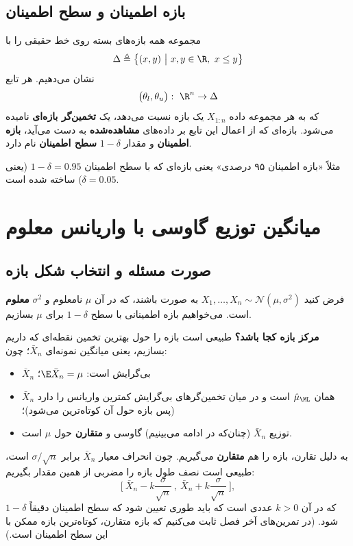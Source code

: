 \subsection{بازه اطمینان و سطح اطمینان}
\begin{definition}
مجموعه همه بازه‌های بسته روی خط حقیقی را با
\[
\Delta\triangleq\big\{(x,y)\ \big|\ x,y\in\R,\ x\le y\big\}
\]
نشان می‌دهیم. هر تابع
\[
\big(\theta_l,\theta_u\big):\ \R^n\to\Delta
\]
که به هر مجموعه داده $X_{1:n}$ یک بازه نسبت می‌دهد، یک \textbf{تخمین‌گر بازه‌ای} نامیده می‌شود. بازه‌ای که از اعمال این تابع بر داده‌های \textbf{مشاهده‌شده} به دست می‌آید، \textbf{بازه اطمینان} و مقدار $1-\delta$ \textbf{سطح اطمینان} نام دارد.
\end{definition}
مثلاً «بازه اطمینان ۹۵ درصدی» یعنی بازه‌ای که با سطح اطمینان $1-\delta=0.95$ (یعنی $\delta=0.05$) ساخته شده است.

\section{میانگین توزیع گاوسی با واریانس معلوم}

\subsection{صورت مسئله و انتخاب شکل بازه}
فرض کنید $X_1,\ldots,X_n\sim\mathcal N(\mu,\sigma^2)$ به صورت  باشند، که در آن $\mu$ نامعلوم و $\sigma^2$ \textbf{معلوم} است. می‌خواهیم بازه اطمینانی با سطح $1-\delta$ برای $\mu$ بسازیم.

\textbf{مرکز بازه کجا باشد؟} طبیعی است بازه را حول بهترین تخمین نقطه‌ای که داریم بسازیم، یعنی میانگین نمونه‌ای $\bar X_n$؛ چون:
\begin{itemize}
\item $\bar X_n$ بی‌گرایش است: $\E\bar X_n=\mu$؛
\item $\bar X_n$ همان $\hat\mu_\ML$ است و در میان تخمین‌گرهای بی‌گرایش کمترین واریانس را دارد (پس بازه حول آن کوتاه‌ترین می‌شود)؛
\item توزیع $\bar X_n$ (چنان‌که در ادامه می‌بینیم) گاوسی و \textbf{متقارن} حول $\mu$ است.
\end{itemize}
به دلیل تقارن، بازه را هم \textbf{متقارن} می‌گیریم. چون انحراف معیار $\bar X_n$ برابر $\sigma/\sqrt n$ است، طبیعی است نصف طول بازه را مضربی از همین مقدار بگیریم:
\[
\Big[\ \bar X_n-k\frac{\sigma}{\sqrt n}\ ,\ \bar X_n+k\frac{\sigma}{\sqrt n}\ \Big],
\]
که در آن $k>0$ عددی است که باید طوری تعیین شود که سطح اطمینان دقیقاً $1-\delta$ شود. (در تمرین‌های آخر فصل ثابت می‌کنیم که بازه متقارن، کوتاه‌ترین بازه ممکن با این سطح اطمینان است.)

